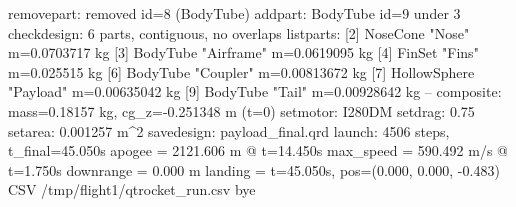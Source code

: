 \begin{console}
\ok removepart: removed id=8 (BodyTube)
\ok addpart: BodyTube id=9 under 3
\ok checkdesign: 6 parts, contiguous, no overlaps
\ok listparts:
  [2] NoseCone "Nose"  m=0.0703717 kg
    [3] BodyTube "Airframe"  m=0.0619095 kg
      [4] FinSet "Fins"  m=0.025515 kg
      [6] BodyTube "Coupler"  m=0.00813672 kg
        [7] HollowSphere "Payload"  m=0.00635042 kg
      [9] BodyTube "Tail"  m=0.00928642 kg
  -- composite: mass=0.18157 kg, cg_z=-0.251348 m (t=0)
\ok setmotor: I280DM
\ok setdrag: 0.75
\ok setarea: 0.001257 m^2
\ok savedesign: payload_final.qrd
\ok launch: 4506 steps, t_final=45.050s
  apogee    = 2121.606 m @ t=14.450s
  max_speed = 590.492 m/s @ t=1.750s
  downrange = 0.000 m
  landing   = t=45.050s, pos=(0.000, 0.000, -0.483)
CSV /tmp/flight1/qtrocket_run.csv
\ok bye
\end{console}
